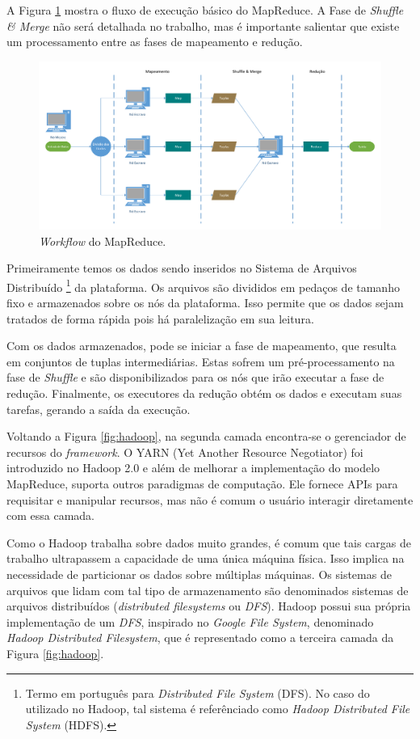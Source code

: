 A Figura \ref{fig:mrworkflow} mostra o fluxo de execução básico do MapReduce. 
A Fase de \emph{Shuffle \& Merge} não será detalhada no trabalho, mas é 
importante salientar que existe um processamento entre as fases de mapeamento e 
redução.

\begin{figure}[ht]
 \centerline{\includegraphics[width=1\textwidth]{./img/mapreduce-workflow.pdf}}
 \caption{\emph{Workflow} do MapReduce.}
 \label{fig:mrworkflow}
\end{figure}

Primeiramente temos os dados sendo inseridos no Sistema de Arquivos Distribuído 
\footnote{Termo em português para \emph{Distributed File System} (DFS). No caso 
do utilizado no Hadoop, tal sistema é referênciado como \emph{Hadoop Distributed 
File System} (HDFS).} da plataforma. Os arquivos são divididos em pedaços de 
tamanho fixo e armazenados sobre os nós da plataforma. Isso permite que os dados 
sejam tratados de forma rápida pois há paralelização em sua leitura.

Com os dados armazenados, pode se iniciar a fase de mapeamento, que resulta em 
conjuntos de tuplas intermediárias. Estas sofrem um pré-processamento na fase 
de \emph{Shuffle} e são disponibilizados para os nós que irão executar a fase 
de redução. Finalmente, os executores da redução obtém os dados e executam suas 
tarefas, gerando a saída da execução.

Voltando a Figura \ref{fig:hadoop}, na segunda camada encontra-se o gerenciador 
de recursos do \emph{framework}. O YARN (Yet Another Resource Negotiator) foi 
introduzido no Hadoop 2.0 e além de melhorar a implementação do modelo 
MapReduce, suporta outros paradigmas de computação. Ele fornece APIs para 
requisitar e manipular recursos, mas não é comum o usuário interagir diretamente 
com essa camada.

Como o Hadoop trabalha sobre dados muito grandes, é comum que tais cargas de 
trabalho ultrapassem a capacidade de uma única máquina física. Isso implica na 
necessidade de particionar os dados sobre múltiplas máquinas. Os sistemas de 
arquivos que lidam com tal tipo de armazenamento são denominados sistemas de 
arquivos distribuídos (\textit{distributed filesystems} ou \textit{DFS}). 
Hadoop possui sua própria implementação de um \textit{DFS}, inspirado no 
\textit{Google File System}, denominado \textit{Hadoop Distributed Filesystem}, 
que é representado como a terceira camada da Figura \ref{fig:hadoop}.

